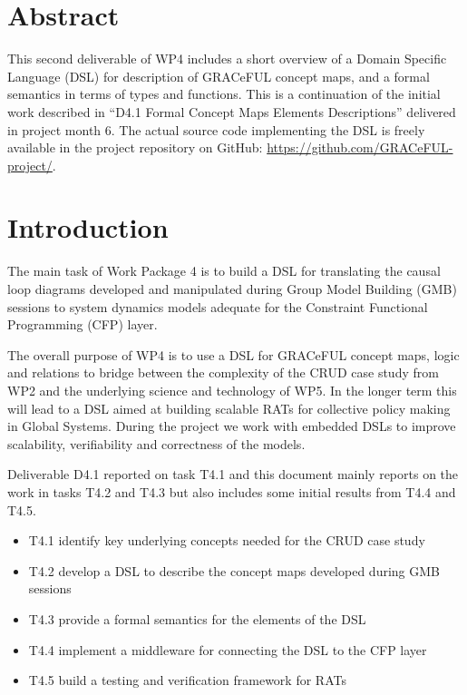 \documentclass[]{article}
\begin{document}
\vfill

\tableofcontents

\vfill

\newpage

\section*{Abstract}\label{abstract}

This second deliverable of WP4 includes a short overview of a Domain
Specific Language (DSL) for description of GRACeFUL concept maps, and
a formal semantics in terms of types and functions. This is a
continuation of the initial work described in ``D4.1 Formal Concept
Maps Elements Descriptions'' delivered in project month 6. The actual
source code implementing the DSL is freely available in the project
repository on GitHub: \url{https://github.com/GRACeFUL-project/}.

\section{Introduction}\label{introduction}

The main task of Work Package 4 is to build a DSL for translating the
causal loop diagrams
developed and manipulated during Group Model
Building (GMB) sessions to system dynamics models adequate for the
Constraint Functional Programming (CFP) layer.

The overall purpose of WP4 is to use a DSL for GRACeFUL concept maps,
logic and relations to bridge between the complexity of the CRUD case
study from WP2 and the underlying science and technology of WP5.  In
the longer term this will lead to a DSL aimed at building scalable
RATs for collective policy making in Global Systems.  During the
project we work with embedded DSLs to improve scalability,
verifiability and correctness of the models.

Deliverable D4.1 reported on task T4.1 and this document mainly
reports on the work in tasks T4.2 and T4.3 but also includes some
initial results from T4.4 and T4.5.

\begin{itemize}
\item T4.1 identify key underlying concepts needed for the CRUD case study
\item T4.2 develop a DSL to describe the concept maps developed during GMB sessions
\item T4.3 provide a formal semantics for the elements of the DSL
\item T4.4 implement a middleware for connecting the DSL to the CFP layer
\item T4.5 build a testing and verification framework for RATs
\end{itemize}
\end{document}
